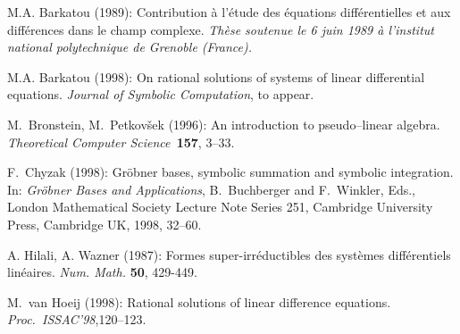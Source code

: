\begin{thebibliography}{99}
M.A. Barkatou (1989):
{Contribution \`a l'\'etude des
\'equations diff\'erentielles et aux diff\'erences dans le champ
complexe}.
{\em Th\`ese soutenue le 6 juin 1989  \`a l'institut
national polytechnique de Grenoble (France).}

M.A. Barkatou (1998):
{On rational solutions of systems
of linear differential equations}.
{\em Journal of Symbolic Computation}, to appear.

M.~Bronstein, M.~Petkov\v sek (1996):
An introduction to pseudo--linear algebra.
{\em Theoretical Computer Science~}{\bf 157}, 3--33.

F.~Chyzak (1998):
Gr\"obner bases, symbolic summation and symbolic integration.
In: {\em Gr\"obner Bases and Applications}, B.~Buchberger and
F.~Winkler, Eds., London Mathematical Society Lecture Note Series
251, Cambridge University Press, Cambridge UK, 1998, 32--60.

A. Hilali, A. Wazner (1987):
{Formes super-irr\'eductibles
des syst\`emes diff\'erentiels lin\'eaires}.
{\em Num. Math.\/} {\bf 50}, 429-449.

M.~van Hoeij (1998):
Rational solutions of linear difference equations.
{\em Proc.~ISSAC'98},120--123.

\end{thebibliography}



